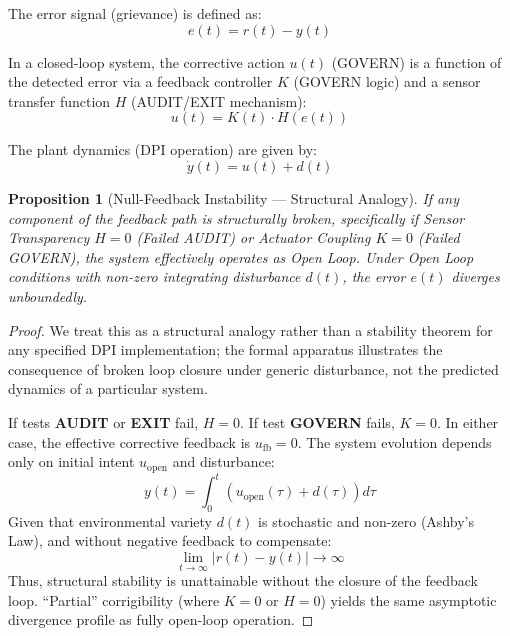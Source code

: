 \documentclass{article}
\newtheorem{proposition}{Proposition}[section]
\begin{document}
The error signal (grievance) is defined as:
\begin{equation}
e(t) = r(t) - y(t)
\end{equation}

In a closed-loop system, the corrective action $u(t)$ (GOVERN) is a function of the detected error via a feedback controller $K$ (GOVERN logic) and a sensor transfer function $H$ (AUDIT/EXIT mechanism):
\begin{equation}
u(t) = K(t) \cdot H(e(t))
\end{equation}

The plant dynamics (DPI operation) are given by:
\begin{equation}
\dot{y}(t) = u(t) + d(t)
\end{equation}

\begin{proposition}[Null-Feedback Instability --- Structural Analogy]
\label{thm:null-feedback}
If any component of the feedback path is structurally broken, specifically if Sensor Transparency $H=0$ (Failed AUDIT) or Actuator Coupling $K=0$ (Failed GOVERN), the system effectively operates as Open Loop. Under Open Loop conditions with non-zero integrating disturbance $d(t)$, the error $e(t)$ diverges unboundedly.
\end{proposition}

\begin{proof}
We treat this as a structural analogy rather than a stability theorem for any specified DPI implementation; the formal apparatus illustrates the consequence of broken loop closure under generic disturbance, not the predicted dynamics of a particular system.

If tests \textbf{AUDIT} or \textbf{EXIT} fail, $H=0$.
If test \textbf{GOVERN} fails, $K=0$.
In either case, the effective corrective feedback is $u_{\text{fb}} = 0$.
The system evolution depends only on initial intent $u_{\text{open}}$ and disturbance:
\begin{equation}
y(t) = \int_0^t (u_{\text{open}}(\tau) + d(\tau)) d\tau
\end{equation}
Given that environmental variety $d(t)$ is stochastic and non-zero (Ashby's Law), and without negative feedback to compensate:
\begin{equation}
\lim_{t \to \infty} |r(t) - y(t)| \to \infty
\end{equation}
Thus, structural stability is unattainable without the closure of the feedback loop. ``Partial'' corrigibility (where $K=0$ or $H=0$) yields the same asymptotic divergence profile as fully open-loop operation.
\end{proof}
\end{document}
